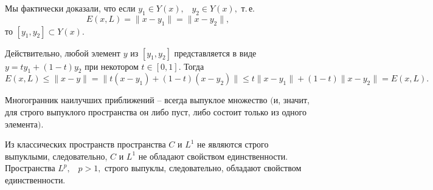\begin{Remark} %
  { Мы фактически доказали, что если $y_1\in Y(x),$~ $y_2\in Y(x),$
 т.\,е.
 $$
 E(x,L)=\|x-y_1\|=\|x-y_2\|,
 $$
 то $[y_1,y_2]\subset Y(x).$}
 \end{Remark}

{ Действительно, любой элемент $y$ из $[y_1,y_2]$
 представляется в виде $y=ty_1+(1-t)y_2$ при некотором $t\in [0,1].$
 Тогда
 $$
{E(x,L)\le} \|x-y\|=\|t(x-y_1)+(1-t)(x-y_2)\|\le t\|x-y_1\|+(1-t)\|x-y_2\|=E(x,L).
 $$}

  \begin{Corollary} %
 Многогранник наилучших приближений -- всегда выпуклое множество $($и, значит, для
 строго выпуклого пространства он либо пуст, либо состоит
 только из одного элемента$)$.
 \end{Corollary}

 Из классических пространств пространства $C$ и ${L^1}$ не являются строго выпуклыми,
 следовательно, $C$ и ${L^1}$ не обладают свойством единственности.
 {Пространства} ${L^p},$~ $p>1,$ строго выпуклы, следовательно, обладают свойством
 единственности.

